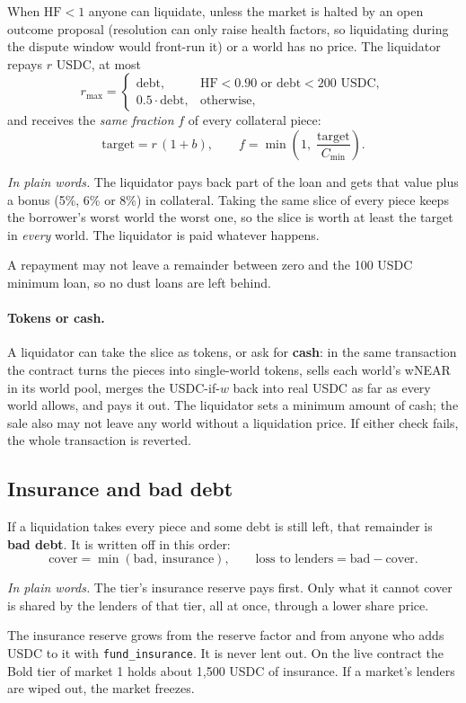 \documentclass[11pt,a4paper]{article}
\newcommand{\code}[1]{\texttt{\small #1}}
\newcommand{\inwords}[1]{\par\noindent\colorbox{note}{\parbox{\dimexpr\linewidth-2\fboxsep}{\small\textit{In plain words.} #1}}\par}
\begin{document}
When $\mathrm{HF} < 1$ anyone can liquidate, unless the market is halted by an open outcome proposal (resolution can
only raise health factors, so liquidating during the dispute window would front-run it) or a world has no price. The
liquidator repays $r$ USDC, at most
\begin{equation}
  r_{\max} = \begin{cases}
    \text{debt}, & \mathrm{HF} < 0.90 \text{ or debt} < 200 \text{ USDC},\\
    0.5\cdot\text{debt}, & \text{otherwise},
  \end{cases}
  \label{eq:rmax}
\end{equation}
and receives the \emph{same fraction} $f$ of every collateral piece:
\begin{equation}
  \text{target} = r\,(1+b), \qquad f = \min\!\left(1,\; \frac{\text{target}}{C_{\min}}\right).
  \label{eq:seize}
\end{equation}
\inwords{The liquidator pays back part of the loan and gets that value plus a bonus (5\%, 6\% or 8\%) in collateral.
Taking the same slice of every piece keeps the borrower's worst world the worst one, so the slice is worth at least
the target in \emph{every} world. The liquidator is paid whatever happens.}
A repayment may not leave a remainder between zero and the 100 USDC minimum loan, so no dust loans are left behind.

\paragraph{Tokens or cash.} A liquidator can take the slice as tokens, or ask for \textbf{cash}: in the same
transaction the contract turns the pieces into single-world tokens, sells each world's wNEAR in its world pool, merges
the USDC-if-$w$ back into real USDC as far as every world allows, and pays it out. The liquidator sets a minimum
amount of cash; the sale also may not leave any world without a liquidation price. If either check fails, the whole
transaction is reverted.

\subsection{Insurance and bad debt}

If a liquidation takes every piece and some debt is still left, that remainder is \textbf{bad debt}. It is written off
in this order:
\begin{equation}
  \text{cover} = \min(\text{bad},\ \text{insurance}), \qquad \text{loss to lenders} = \text{bad} - \text{cover}.
  \label{eq:baddebt}
\end{equation}
\inwords{The tier's insurance reserve pays first. Only what it cannot cover is shared by the lenders of that tier, all
at once, through a lower share price.}
The insurance reserve grows from the reserve factor and from anyone who adds USDC to it with \code{fund\_insurance}.
It is never lent out. On the live contract the Bold tier of market 1 holds about 1,500 USDC of insurance. If a
market's lenders are wiped out, the market freezes.
\end{document}

